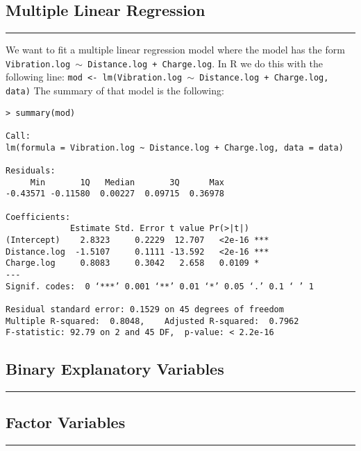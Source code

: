 \subsection{Multiple Linear Regression}
\noindent\rule[\linienAbstand]{\linewidth}{\linienDicke}
We want to fit a multiple linear regression model where the model has the form \texttt{Vibration.log $\sim$ Distance.log + Charge.log}. In R we do this with the following line:
\texttt{mod <- lm(Vibration.log $\sim$ Distance.log + Charge.log, data)}
The summary of that model is the following:
\begingroup
\scriptsize
\begin{verbatim}
> summary(mod)

Call:
lm(formula = Vibration.log ~ Distance.log + Charge.log, data = data)

Residuals:
     Min       1Q   Median       3Q      Max
-0.43571 -0.11580  0.00227  0.09715  0.36978

Coefficients:
             Estimate Std. Error t value Pr(>|t|)
(Intercept)    2.8323     0.2229  12.707   <2e-16 ***
Distance.log  -1.5107     0.1111 -13.592   <2e-16 ***
Charge.log     0.8083     0.3042   2.658   0.0109 *
---
Signif. codes:  0 ‘***’ 0.001 ‘**’ 0.01 ‘*’ 0.05 ‘.’ 0.1 ‘ ’ 1

Residual standard error: 0.1529 on 45 degrees of freedom
Multiple R-squared:  0.8048,	Adjusted R-squared:  0.7962
F-statistic: 92.79 on 2 and 45 DF,  p-value: < 2.2e-16
\end{verbatim}
\endgroup

\subsection{Binary Explanatory Variables}
\noindent\rule[\linienAbstand]{\linewidth}{\linienDicke}
\subsection{Factor Variables}
\noindent\rule[\linienAbstand]{\linewidth}{\linienDicke}

%

